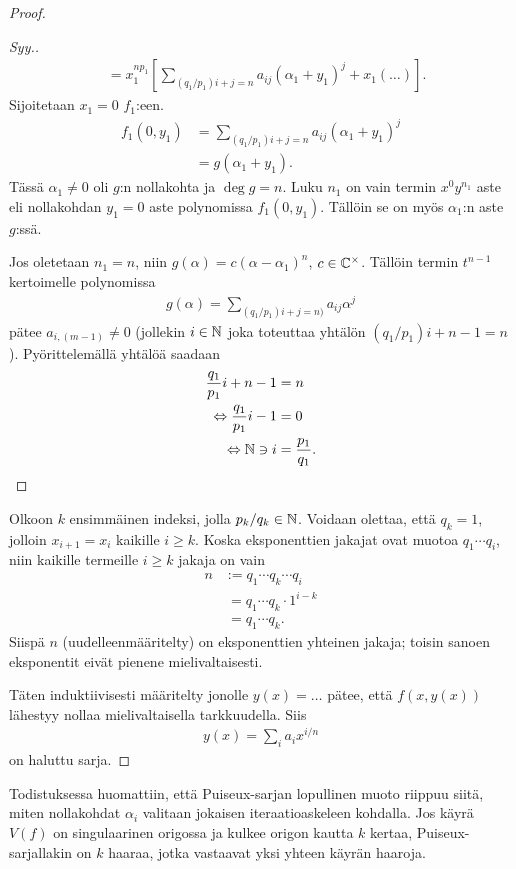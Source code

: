 \begin{proof}
\begin{proof}[Syy.]
\begin{align*}
            &=x_1^{n p_1}\left[\sum_{(q_1/p_1)i+j=n}a_{ij}(\alpha_1+y_1)^j+x_1(\dots)\right].
        \end{align*}
        Sijoitetaan $x_1=0$ $f_1$:een.
        \begin{align*}
            f_1(0,y_1)&=\sum_{(q_1/p_1)i+j=n}a_{ij}(\alpha_1+y_1)^j \\
            &=g(\alpha_1+y_1).
        \end{align*}
        Tässä $\alpha_1\ne0$ oli $g$:n nollakohta ja $\deg g=n$. Luku $n_1$ on vain termin $x^0y^{n_1}$ aste eli nollakohdan $y_1=0$ aste polynomissa $f_1(0,y_1)$. Tällöin se on myös $\alpha_1$:n aste $g$:ssä.

        Jos oletetaan $n_1=n$, niin $g(\alpha)=c(\alpha-\alpha_1)^n$, $c\in\mathbb{C}^\times$. Tällöin termin $t^{n-1}$ kertoimelle polynomissa
        \begin{align*}
            g(\alpha)=\sum_{(q_1/p_1)i+j=n)}a_{ij}\alpha^j
        \end{align*}
        pätee $a_{i,(m-1)}\ne0$ (jollekin $i\in\mathbb{N}$ joka toteuttaa yhtälön $(q_1/p_1)i+n-1=n$). Pyörittelemällä yhtälöä saadaan
        \begin{align*}
            \frac{q_1}{p_1}i+n-1&=n \\
            \Leftrightarrow\frac{q_1}{p_1}i-1&=0 \\
            \Leftrightarrow\mathbb{N}\ni i&=\frac{p_1}{q_1}.
        \end{align*}
    \end{proof}
    Olkoon $k$ ensimmäinen indeksi, jolla $p_k/q_k\in\mathbb{N}$. Voidaan olettaa, että $q_k=1$, jolloin $x_{i+1}=x_i$ kaikille $i\geq k$. Koska eksponenttien jakajat ovat muotoa $q_1\cdots q_i$, niin kaikille termeille $i\geq k$ jakaja on vain
    \begin{align*}
        n&:=q_1\cdots q_k\cdots q_i \\
        &\ =q_1\cdots q_k\cdot1^{i-k} \\
        &\ =q_1\cdots q_k.
    \end{align*}
    Siispä $n$ (uudelleenmääritelty) on eksponenttien yhteinen jakaja; toisin sanoen eksponentit eivät pienene mielivaltaisesti.

    Täten induktiivisesti määritelty jonolle $y(x)=\dots$ pätee, että $f(x,y(x))$ lähestyy nollaa mielivaltaisella tarkkuudella. Siis 
    \begin{align*}
        y(x)=\sum_{i}a_ix^{i/n}
    \end{align*}
    on haluttu sarja.
\end{proof}
Todistuksessa huomattiin, että Puiseux-sarjan lopullinen muoto riippuu siitä, miten nollakohdat $\alpha_i$ valitaan jokaisen iteraatioaskeleen kohdalla. Jos käyrä $V(f)$ on singulaarinen origossa ja kulkee origon kautta $k$ kertaa,  Puiseux-sarjallakin on $k$ haaraa, jotka vastaavat yksi yhteen käyrän haaroja.

